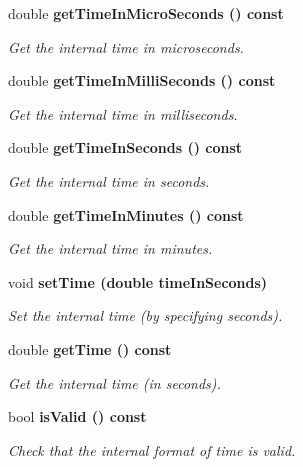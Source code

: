 \begin{CompactItemize}
double \bf{get\-Time\-In\-Micro\-Seconds} () const 
\begin{CompactList}\small\item\em Get the internal time in microseconds. \item\end{CompactList}\item 
double \bf{get\-Time\-In\-Milli\-Seconds} () const 
\begin{CompactList}\small\item\em Get the internal time in milliseconds. \item\end{CompactList}\item 
double \bf{get\-Time\-In\-Seconds} () const 
\begin{CompactList}\small\item\em Get the internal time in seconds. \item\end{CompactList}\item 
double \bf{get\-Time\-In\-Minutes} () const 
\begin{CompactList}\small\item\em Get the internal time in minutes. \item\end{CompactList}\item 
void \bf{set\-Time} (double time\-In\-Seconds)
\begin{CompactList}\small\item\em Set the internal time (by specifying seconds). \item\end{CompactList}\item 
double \bf{get\-Time} () const 
\begin{CompactList}\small\item\em Get the internal time (in seconds). \item\end{CompactList}\item 
bool \bf{is\-Valid} () const 
\begin{CompactList}\small\item\em Check that the internal format of time is valid. \item\end{CompactList}\end{CompactItemize}
